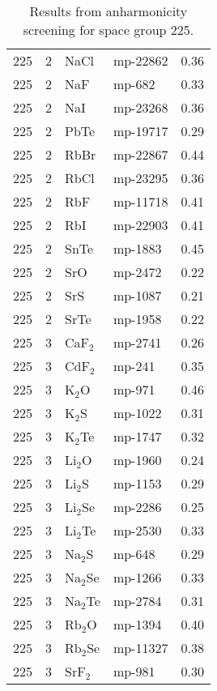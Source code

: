 \begin{table}[t]
\begin{tabular}{rrllr}
         225 &            2 &         NaCl &   mp-22862 &       0.36 \\
         225 &            2 &          NaF &     mp-682 &       0.33 \\
         225 &            2 &          NaI &   mp-23268 &       0.36 \\
         225 &            2 &         PbTe &   mp-19717 &       0.29 \\
         225 &            2 &         RbBr &   mp-22867 &       0.44 \\
         225 &            2 &         RbCl &   mp-23295 &       0.36 \\
         225 &            2 &          RbF &   mp-11718 &       0.41 \\
         225 &            2 &          RbI &   mp-22903 &       0.41 \\
         225 &            2 &         SnTe &    mp-1883 &       0.45 \\
         225 &            2 &          SrO &    mp-2472 &       0.22 \\
         225 &            2 &          SrS &    mp-1087 &       0.21 \\
         225 &            2 &         SrTe &    mp-1958 &       0.22 \\
         225 &            3 &      CaF$_2$ &    mp-2741 &       0.26 \\
         225 &            3 &      CdF$_2$ &     mp-241 &       0.35 \\
         225 &            3 &       K$_2$O &     mp-971 &       0.46 \\
         225 &            3 &       K$_2$S &    mp-1022 &       0.31 \\
         225 &            3 &      K$_2$Te &    mp-1747 &       0.32 \\
         225 &            3 &      Li$_2$O &    mp-1960 &       0.24 \\
         225 &            3 &      Li$_2$S &    mp-1153 &       0.29 \\
         225 &            3 &     Li$_2$Se &    mp-2286 &       0.25 \\
         225 &            3 &     Li$_2$Te &    mp-2530 &       0.33 \\
         225 &            3 &      Na$_2$S &     mp-648 &       0.29 \\
         225 &            3 &     Na$_2$Se &    mp-1266 &       0.33 \\
         225 &            3 &     Na$_2$Te &    mp-2784 &       0.31 \\
         225 &            3 &      Rb$_2$O &    mp-1394 &       0.40 \\
         225 &            3 &     Rb$_2$Se &   mp-11327 &       0.38 \\
         225 &            3 &      SrF$_2$ &     mp-981 &       0.30 \\
\bottomrule
\end{tabular}
   \caption{Results from anharmonicity screening for space group 225.}
   \label{tab:screening.sigma.3}
 \end{table}
